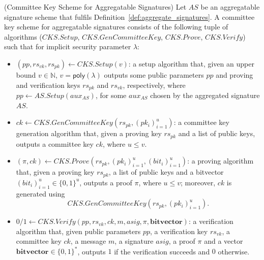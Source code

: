 \begin{definition}
\label{def: committee_key} (Committee Key Scheme for Aggregatable Signatures) Let $\mathit{AS}$ be an aggregatable signature scheme that fulfils 
Definition~\ref{def:aggregate_signatures}.  A committee key scheme for aggregatable signatures consists of the following tuple of algorithms 
($\mathit{CKS.Setup}$, $\mathit{CKS.GenCommitteeKey}$, $\mathit{CKS.Prove}$, $\mathit{CKS.Verify}$) 
such that for implicit security parameter $\lambda$: 

\begin{itemize}
\item $(\mathit{pp}, \mathit{rs}_{\mathit{vk}}, \mathit{rs}_{\mathit{pk}}) \leftarrow \mathit{CKS.Setup}(v)$: a setup algorithm that, 
given an upper bound $v \in \mathbb{N}$, $v = \mathsf{poly}(\lambda)$ outputs some public parameters $\mathit{pp}$ and 
proving and verification keys $\mathit{rs}_{\mathit{pk}}$ and $\mathit{rs}_{\mathit{vk}}$, respectively,  
where $\mathit{pp} \leftarrow \mathit{AS.Setup}(\mathit{aux_{\mathit{AS}}})$, for some 
$\mathit{aux_{\mathit{AS}}}$ chosen by the aggregated signature $\mathit{AS}$.

\item $\mathit{ck} \leftarrow \mathit{CKS.GenCommitteeKey}(\mathit{rs}_{\mathit{pk}}, (\mathit{pk_i})_{i=1}^u)$: a committee key generation algorithm that, 
given a proving key $\mathit{rs}_{\mathit{pk}}$ and a list of public keys, 
outputs a committee key $\mathit{ck}$, where $u \leq v$.

\item $(\pi, \mathit{ck}) \leftarrow \mathit{CKS.Prove}(\mathit{rs}_{\mathit{pk}}, (\mathit{pk_i})_{i=1}^u, (\mathit{bit_i})_{i=1}^u)$: a proving algorithm that, 
given a proving key $\mathit{rs}_{\mathit{pk}}$, a list of public keys and a bitvector $(\mathit{bit_i})_{i=1}^u \in \{0,1\}^u$,  
outputs a proof $\pi$, where $u \leq v$; moreover, $\mathit{ck}$ is generated using $$\mathit{CKS.GenCommitteeKey}(\mathit{rs}_{\mathit{pk}}, (\mathit{pk_i})_{i=1}^u).$$
 
\item $0/1 \leftarrow \mathit{CKS.Verify}(\mathit{pp}, \mathit{rs}_{\mathit{vk}}, \mathit{ck}, m, \mathit{asig}, \pi, \mathbf{bitvector})$: a verification algorithm that, 
given public parameters $\mathit{pp}$, a verification key $\mathit{rs}_{\mathit{vk}}$, a committee key $\mathit{ck}$, a message $m$, a 
signature $\mathit{asig}$, a proof $\pi$ and a vector  $\mathbf{bitvector} \in \{0,1\}^*$, 
outputs $1$ if the verification succeeds and $0$ otherwise. 
\end{itemize}


\end{definition}
